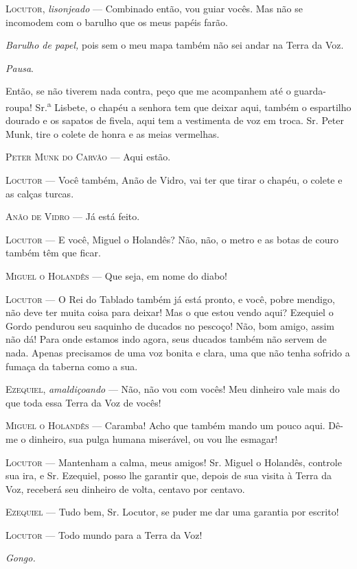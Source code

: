 \begin{myparindent}{0pt}
\begin{Parskip}
\textsc{Locutor}, \emph{lisonjeado} --- Combinado então, vou guiar vocês. Mas não
se incomodem com o barulho que os meus papéis farão.

\emph{Barulho de papel,} pois sem o meu mapa também não sei andar na
Terra da Voz.

\emph{Pausa}.

Então, se não tiverem nada contra, peço que me acompanhem até o
guarda-roupa! Sr.\textsuperscript{a} Lisbete, o chapéu a senhora tem que
deixar aqui, também o espartilho dourado e os sapatos de fivela, aqui
tem a vestimenta de voz em troca. Sr. Peter Munk, tire o colete de honra
e as meias vermelhas.

\textsc{Peter Munk do Carvão} --- Aqui estão.

\textsc{Locutor} --- Você também, Anão de Vidro, vai ter que tirar o chapéu, o
colete e as calças turcas.

\textsc{Anão de Vidro} --- Já está feito.

\textsc{Locutor} --- E você, Miguel o Holandês? Não, não, o metro e as botas de
couro também têm que ficar.

\textsc{Miguel o Holandês} --- Que seja, em nome do diabo!

\textsc{Locutor} --- O Rei do Tablado também já está pronto, e você, pobre
mendigo, não deve ter muita coisa para deixar! Mas o que estou vendo
aqui? Ezequiel o Gordo pendurou seu saquinho de ducados no pescoço! Não,
bom amigo, assim não dá! Para onde estamos indo agora, seus ducados
também não servem de nada. Apenas precisamos de uma voz bonita e clara,
uma que não tenha sofrido a fumaça da taberna como a sua.

\textsc{Ezequiel}, \emph{amaldiçoando} --- Não, não vou com vocês! Meu dinheiro
vale mais do que toda essa Terra da Voz de vocês!

\textsc{Miguel o Holandês} --- Caramba! Acho que também mando um pouco aqui. Dê-me
o dinheiro, sua pulga humana miserável, ou vou lhe esmagar!

\textsc{Locutor} --- Mantenham a calma, meus amigos! Sr. Miguel o Holandês,
controle sua ira, e Sr. Ezequiel, posso lhe garantir que, depois de sua
visita à Terra da Voz, receberá seu dinheiro de volta, centavo por
centavo.

\textsc{Ezequiel} --- Tudo bem, Sr. Locutor, se puder me dar uma garantia por
escrito!

\textsc{Locutor} --- Todo mundo para a Terra da Voz!

\emph{Gongo.}


\end{Parskip}
\end{myparindent}
